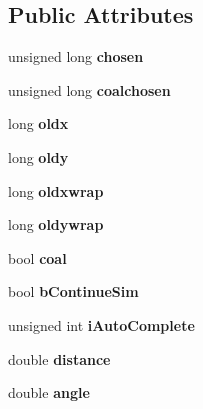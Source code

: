 \subsection*{Public Attributes}
\begin{DoxyCompactItemize}
\item 
unsigned long {\bfseries chosen}\hypertarget{struct_step_a03a0984250a050752ff20129ff457510}{}\label{struct_step_a03a0984250a050752ff20129ff457510}

\item 
unsigned long {\bfseries coalchosen}\hypertarget{struct_step_a5824c6f227fbe3aa249f6067bae0aab2}{}\label{struct_step_a5824c6f227fbe3aa249f6067bae0aab2}

\item 
long {\bfseries oldx}\hypertarget{struct_step_a79f782f87fe4df1f7df10bc6b102530a}{}\label{struct_step_a79f782f87fe4df1f7df10bc6b102530a}

\item 
long {\bfseries oldy}\hypertarget{struct_step_afde730c847c774e13f96c36a2a87a818}{}\label{struct_step_afde730c847c774e13f96c36a2a87a818}

\item 
long {\bfseries oldxwrap}\hypertarget{struct_step_ad627fdb344ea1b6e143bf81794955f9a}{}\label{struct_step_ad627fdb344ea1b6e143bf81794955f9a}

\item 
long {\bfseries oldywrap}\hypertarget{struct_step_ae18da2822c5603f935b02454c1c8f9f3}{}\label{struct_step_ae18da2822c5603f935b02454c1c8f9f3}

\item 
bool {\bfseries coal}\hypertarget{struct_step_a20362fa305c240b197cab6934b4b5087}{}\label{struct_step_a20362fa305c240b197cab6934b4b5087}

\item 
bool {\bfseries b\+Continue\+Sim}\hypertarget{struct_step_a38035eb27c4eb998e5303905356a2cab}{}\label{struct_step_a38035eb27c4eb998e5303905356a2cab}

\item 
unsigned int {\bfseries i\+Auto\+Complete}\hypertarget{struct_step_ad717fe7188f60b50db9675d3cd5ad9d8}{}\label{struct_step_ad717fe7188f60b50db9675d3cd5ad9d8}

\item 
double {\bfseries distance}\hypertarget{struct_step_adcded9ae31a77edc5b91457e38008a7a}{}\label{struct_step_adcded9ae31a77edc5b91457e38008a7a}

\item 
double {\bfseries angle}\hypertarget{struct_step_a92772e673d8c49b468df8710e49cffcb}{}\label{struct_step_a92772e673d8c49b468df8710e49cffcb}

\end{DoxyCompactItemize}


